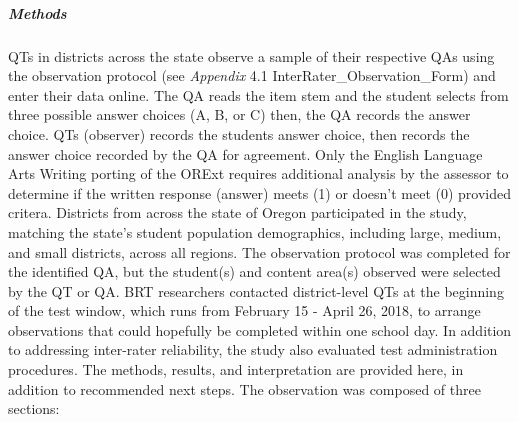 \documentclass[]{article}
\let\oldsubparagraph\subparagraph
\renewcommand{\subparagraph}[1]{\oldsubparagraph{#1}\mbox{}}
\begin{document}
\hypertarget{methods}{%
\subparagraph{Methods}\label{methods}}

QTs in districts across the state observe a sample of their respective
QAs using the observation protocol (see \emph{Appendix} 4.1
InterRater\_Observation\_Form) and enter their data online. The QA reads
the item stem and the student selects from three possible answer choices
(A, B, or C) then, the QA records the answer choice. QTs (observer)
records the students answer choice, then records the answer choice
recorded by the QA for agreement. Only the English Language Arts Writing
porting of the ORExt requires additional analysis by the assessor to
determine if the written response (answer) meets (1) or doesn't meet (0)
provided critera. Districts from across the state of Oregon participated
in the study, matching the state's student population demographics,
including large, medium, and small districts, across all regions. The
observation protocol was completed for the identified QA, but the
student(s) and content area(s) observed were selected by the QT or QA.
BRT researchers contacted district-level QTs at the beginning of the
test window, which runs from February 15 - April 26, 2018, to arrange
observations that could hopefully be completed within one school day. In
addition to addressing inter-rater reliability, the study also evaluated
test administration procedures. The methods, results, and interpretation
are provided here, in addition to recommended next steps. The
observation was composed of three sections:
\end{document}

